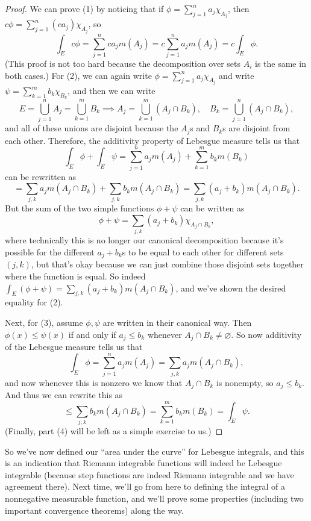 \begin{proof}
We can prove (1) by noticing that if $\phi = \sum_{j=1}^n a_j \chi_{A_j}$, then $c\phi = \sum_{j=1}^n (ca_j)\chi_{A_j}$, so 
\[
    \int_E c\phi = \sum_{j=1}^n ca_j m(A_j) = c \sum_{j=1}^n a_j m(A_j) = c \int_E \phi.
\]  
(This proof is not too hard because the decomposition over sets $A_i$ is the same in both cases.) For (2), we can again write $\phi = \sum_{j=1}^n a_j \chi_{A_j}$ and write $\psi = \sum_{k=1}^m b_k \chi_{B_k}$, and then we can write 
\[
    E = \bigcup_{j=1}^n A_j = \bigcup_{k=1}^m B_k \implies A_j = \bigcup_{k=1}^m (A_j \cap B_k), \quad B_k = \bigcup_{j=1}^n (A_j \cap B_k),
\]
and all of these unions are disjoint because the $A_j$s and $B_k$s are disjoint from each other. Therefore, the additivity property of Lebesgue measure tells us that 
\[
    \int_E \phi + \int_E \psi = \sum_{j=1}^n a_j m(A_j) + \sum_{k=1}^m b_k m(B_k)
\]
can be rewritten as 
\[
    = \sum_{j, k} a_j m(A_j \cap B_k) + \sum_{j, k} b_k m(A_j \cap B_k) = \sum_{j, k} (a_j + b_k) m(A_j \cap B_k).
\]
But the sum of the two simple functions $\phi + \psi$ can be written as 
\[
    \phi + \psi = \sum_{j, k} (a_j + b_k) \chi_{A_j \cap B_k},
\]
where technically this is no longer our canonical decomposition because it's possible for the different $a_j + b_k$s to be equal to each other for different sets $(j, k)$, but that's okay because we can just combine those disjoint sets together where the function is equal. So indeed $\int_E (\phi + \psi) = \sum_{j, k} (a_j + b_k) m(A_j \cap B_k)$, and we've shown the desired equality for (2). 

Next, for (3), assume $\phi, \psi$ are written in their canonical way. Then $\phi(x) \le \psi(x)$ if and only if $a_j \le b_k$ whenever $A_j \cap B_k \ne \varnothing$. So now additivity of the Lebesgue measure tells us that
\[
    \int_E \phi = \sum_{j=1}^n a_j m(A_j) = \sum_{j, k} a_j m(A_j \cap B_k),
\]
and now whenever this is nonzero we know that $A_j \cap B_k$ is nonempty, so $a_j \le b_k$. And thus we can rewrite this as 
\[
    \le \sum_{j, k} b_k m(A_j \cap B_k) = \sum_{k=1}^m b_k m(B_k) = \int_E \psi.
\]
(Finally, part (4) will be left as a simple exercise to us.)
\end{proof}

So we've now defined our ``area under the curve'' for Lebesgue integrals, and this is an indication that Riemann integrable functions will indeed be Lebesgue integrable (because step functions are indeed Riemann integrable and we have agreement there). Next time, we'll go from here to defining the integral of a nonnegative measurable function, and we'll prove some properties (including two important convergence theorems) along the way.